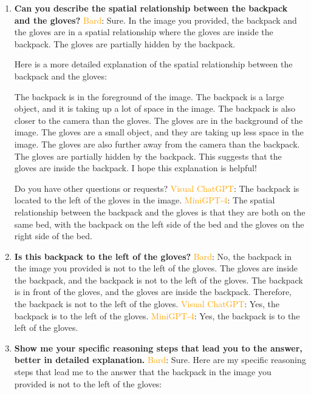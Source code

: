 \begin{enumerate}
    \item \textbf{Can you describe the spatial relationship between the backpack and the gloves?}
    \subitem \textcolor{orange}{Bard}: Sure. In the image you provided, the backpack and the gloves are in a spatial relationship where the gloves are inside the backpack. The gloves are partially hidden by the backpack.

    Here is a more detailed explanation of the spatial relationship between the backpack and the gloves:
    
    The backpack is in the foreground of the image. The backpack is a large object, and it is taking up a lot of space in the image. The backpack is also closer to the camera than the gloves.
    The gloves are in the background of the image. The gloves are a small object, and they are taking up less space in the image. The gloves are also further away from the camera than the backpack.
    The gloves are partially hidden by the backpack. This suggests that the gloves are inside the backpack.
    I hope this explanation is helpful!
    
    Do you have other questions or requests?
    \subitem \textcolor{orange}{Visual ChatGPT}: The backpack is located to the left of the gloves in the image.
    \subitem \textcolor{orange}{MiniGPT-4}: The spatial relationship between the backpack and the gloves is that they are both on the same bed, with the backpack on the left side of the bed and the gloves on the right side of the bed.
    \item \textbf{Is this backpack to the left of the gloves?}
    \subitem \textcolor{orange}{Bard}: 
    No, the backpack in the image you provided is not to the left of the gloves. The gloves are inside the backpack, and the backpack is not to the left of the gloves. The backpack is in front of the gloves, and the gloves are inside the backpack. Therefore, the backpack is not to the left of the gloves.
    \subitem \textcolor{orange}{Visual ChatGPT}: Yes, the backpack is to the left of the gloves.
    \subitem \textcolor{orange}{MiniGPT-4}: Yes, the backpack is to the left of the gloves.
    \item \textbf{Show me your specific reasoning steps that lead you to the answer, better in detailed explanation.}
    \subitem \textcolor{orange}{Bard}: 
    Sure. Here are my specific reasoning steps that lead me to the answer that the backpack in the image you provided is not to the left of the gloves:


\end{enumerate}

